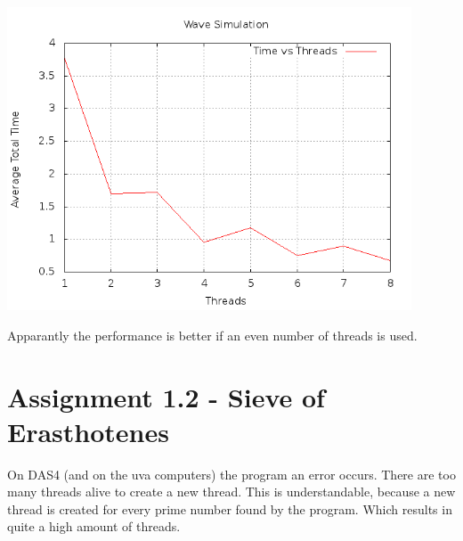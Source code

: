 \documentclass[a4paper]{article}
\begin{document}
    \begin{center}
      \includegraphics[width=0.9\textwidth]{speedplot.png}
    \end{center}
    Apparantly the performance is better if an even number of threads is used.
  \section{Assignment 1.2 - Sieve of Erasthotenes}
    On DAS4 (and on the uva computers) the program an error occurs.
    There are too many threads alive to create a new thread. This is understandable, because
    a new thread is created for every prime number found by the program.
    Which results in quite a high amount of threads.
    
\end{document}
